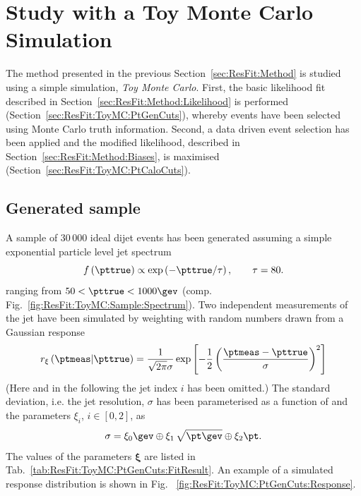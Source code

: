 

\section{Study with a Toy Monte Carlo Simulation}\label{sec:ResFit:ToyMC}

The method presented in the previous Section~\ref{sec:ResFit:Method}
is studied using a simple simulation, \textit{Toy Monte Carlo}.
First, the basic likelihood fit described in
Section~\ref{sec:ResFit:Method:Likelihood} is performed (Section~\ref{sec:ResFit:ToyMC:PtGenCuts}),
whereby events have been selected using Monte Carlo truth information.
Second, a data driven event selection has been applied and the
modified likelihood, described in
Section~\ref{sec:ResFit:Method:Biases}, is maximised (Section~\ref{sec:ResFit:ToyMC:PtCaloCuts}).


\subsection{Generated sample}\label{sec:ResFit:ToyMC:Sample}

A sample of $30\,000$ ideal dijet events has been generated assuming a
simple exponential particle level jet \pt spectrum
\begin{equation}
  \label{eq:ResFit:ToyMC:Spectrum}
  f\left(\pttrue\right) \propto \exp\left(-\pttrue / \tau\right),
  \qquad \tau = 80.
\end{equation}
ranging from \mbox{$50 < \pttrue < 1000\gev$} (comp. Fig.~\ref{fig:ResFit:ToyMC:Sample:Spectrum}).
Two independent measurements of the jet \pt have been simulated by
weighting \pttrue with random numbers drawn from a Gaussian response
\begin{equation}
  \label{eq:ResFit:ToyMC:Response}
  r_{\mathbf{\xi}}\left(\ptmeas|\pttrue\right) = 
  \frac{1}{\sqrt{2\pi}\sigma}\exp\left[-\frac{1}{2}\left(\frac{\ptmeas - \pttrue}{\sigma}\right)^{2}\right]
\end{equation}
(Here and in the following the jet index $i$ has been omitted.)
The standard deviation, i.e. the jet resolution, $\sigma$ has been parameterised as a function of \pttrue and
the parameters $\xi_{i}$, \mbox{$i\in [0,2]$}, as
\begin{equation}
  \label{eq:ResFit:ToyMC:Sigma}
  \sigma = \xi_{0}\gev
  \oplus \xi_{1}\,\sqrt{\pt\gev}\oplus \xi_{2}\pt.
\end{equation}
The values of the parameters $\mathbf{\xi}$ are listed in
Tab.~\ref{tab:ResFit:ToyMC:PtGenCuts:FitResult}.
An example of a simulated response distribution is shown in Fig. ~\ref{fig:ResFit:ToyMC:PtGenCuts:Response}.

